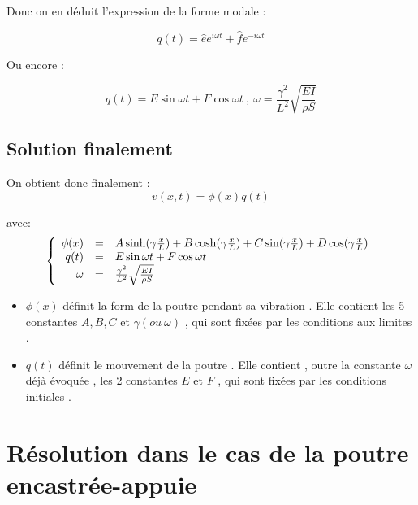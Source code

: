 \documentclass[a4paper,10pt]{report} %
\begin{document}
Donc on en déduit l'expression de la forme modale :

\begin{equation}
    q(t)=\hat{e}e^{i\omega t}+\hat{f}e^{-i\omega t}
    \label{equation12}
\end{equation}

Ou encore :

\begin{equation}
    q(t)=E\sin{\omega t}+F\cos{\omega t}\ , \ \omega=\frac{\gamma^2}{L^2}\sqrt{\frac{EI}{\rho S}}
    \label{equation13}
\end{equation}


\section{Solution finalement}
On obtient donc finalement :
\begin{equation}
	v(x,t)=\phi (x)q(t)
	\label{equation15}
\end{equation}

avec:
\begin{equation}
    \left\{
    \begin{array}{r c l}
        \phi(x)&=&A\sinh(\gamma\frac{x}{L})+B\cosh(\gamma\frac{x}{L})+C\sin(\gamma\frac{x}{L})+D\cos(\gamma\frac{x}{L})\\q(t)&=&E\sin{\omega t}+F\cos{\omega t}\\
        \omega&=&\frac{\gamma^2}{L^2}\sqrt{\frac{EI}{\rho S}}
    \end{array}
    \right.
\end{equation}

\begin{itemize}
    \item $\phi (x)$  définit la form de la poutre pendant sa vibration . Elle contient les 5 constantes $A, B, C$ et $\gamma (ou\ \omega)$ , qui sont fixées par les conditions aux limites .
    
    \item $q(t)$ définit le mouvement de la poutre . Elle contient , outre la constante $\omega$ déjà évoquée , les 2 constantes $E$ et $F$ , qui sont fixées par les conditions initiales .
\end{itemize}



\chapter{Résolution dans le cas de la poutre encastrée-appuie} %
\end{document}
